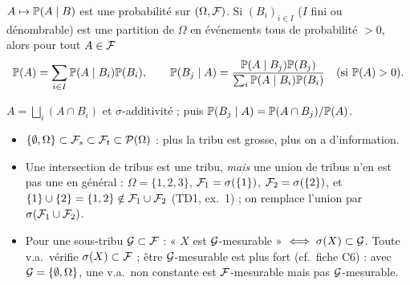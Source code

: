 \documentclass[11pt,a4paper]{article}
\begin{document}
\begin{horscours}\label{C1:bayes}
$A\mapsto\mathbb{P}(A\mid B)$ est une probabilité sur $(\Omega,\mathcal{F})$. Si $(B_i)_{i\in I}$ ($I$ fini ou dénombrable)
est une partition de $\Omega$ en événements tous de probabilité $>0$, alors pour tout $A\in\mathcal{F}$
\[\mathbb{P}(A)=\sum_{i\in I}\mathbb{P}(A\mid B_i)\mathbb{P}(B_i),\qquad
\mathbb{P}(B_j\mid A)=\frac{\mathbb{P}(A\mid B_j)\mathbb{P}(B_j)}{\sum_{i}\mathbb{P}(A\mid B_i)\mathbb{P}(B_i)}\quad(\text{si }\mathbb{P}(A)>0).\]
\end{horscours}
\begin{idee}
$A=\bigsqcup_i(A\cap B_i)$ et $\sigma$-additivité ; puis $\mathbb{P}(B_j\mid A)=\mathbb{P}(A\cap B_j)/\mathbb{P}(A)$.
\end{idee}

\begin{liens}
\begin{itemize}
  \item $\{\emptyset,\Omega\}\subset\mathcal{F}_s\subset\mathcal{F}_t\subset\mathcal{P}(\Omega)$ : plus la tribu est grosse, plus on a d'information.
  \item Une intersection de tribus est une tribu, \emph{mais} une union de tribus n'en est pas une en général :
  $\Omega=\{1,2,3\}$, $\mathcal{F}_1=\sigma(\{1\})$, $\mathcal{F}_2=\sigma(\{2\})$, et $\{1\}\cup\{2\}=\{1,2\}\notin\mathcal{F}_1\cup\mathcal{F}_2$ (TD1, ex.~1) ; on remplace l'union par $\sigma(\mathcal{F}_1\cup\mathcal{F}_2)$.
  \item Pour une sous-tribu $\mathcal{G}\subset\mathcal{F}$ : « $X$ est $\mathcal{G}$-mesurable » $\iff\sigma(X)\subset\mathcal{G}$. Toute v.a.\ vérifie
  $\sigma(X)\subset\mathcal{F}$ ; être $\mathcal{G}$-mesurable est plus fort (cf.\ fiche C6) : avec $\mathcal{G}=\{\emptyset,\Omega\}$, une v.a.\ non constante est $\mathcal{F}$-mesurable mais pas $\mathcal{G}$-mesurable.
\end{itemize}
\end{liens}
\end{document}

